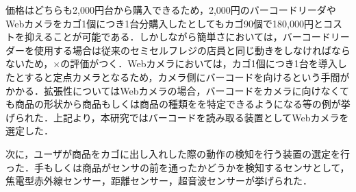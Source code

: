 価格はどちらも2,000円台から購入できるため，2,000円のバーコードリーダやWebカメラをカゴ1個につき1台分購入したとしてもカゴ90個で180,000円とコストを抑えることが可能である．しかしながら簡単さにおいては，バーコードリーダーを使用する場合は従来のセミセルフレジの店員と同じ動きをしなければならないため，×の評価がつく．Webカメラにおいては，カゴ1個につき1台を導入したとすると定点カメラとなるため，カメラ側にバーコードを向けるという手間がかかる．拡張性についてはWebカメラの場合，バーコードをカメラに向けなくても商品の形状から商品もしくは商品の種類をを特定できるようになる等の例が挙げられた．上記より，本研究ではバーコードを読み取る装置としてWebカメラを選定した．




次に，ユーザが商品をカゴに出し入れした際の動作の検知を行う装置の選定を行った．手もしくは商品がセンサの前を通ったかどうかを検知するセンサとして，焦電型赤外線センサー，距離センサー，超音波センサーが挙げられた．

